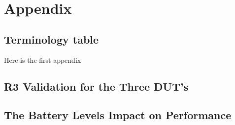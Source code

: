 \chapter{Appendix}\label{ch:appAlabel}

\section{Terminology table}
Here is the first appendix   




\section{R3 Validation for the Three DUT's}\label{app:r3_validation}

% 
% 
% 
% 

% 
% 
% 
% 



\section{The Battery Levels Impact on Performance}\label{app:charge}
% 
% 
% 

